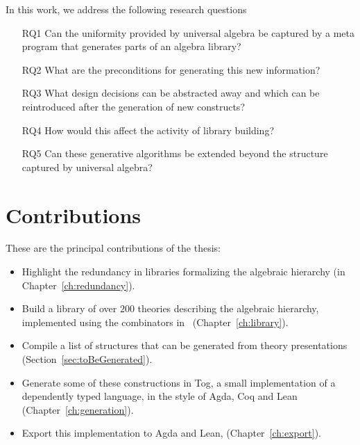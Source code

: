 In this work, we address the following research questions
\begin{enumerate}
    \item[RQ1] Can the uniformity provided by universal algebra be captured by a meta program that generates parts of an algebra library? 
    \item[RQ2] What are the preconditions for generating this new information? 
    \item[RQ3] What design decisions can be abstracted away and which can be reintroduced after the generation of new constructs?
    \item[RQ4] How would this affect the activity of library building?
    \item[RQ5] Can these generative algorithms be extended beyond the structure captured by universal algebra? 
\end{enumerate}

\section{Contributions}
These are the principal contributions of the thesis: 
\begin{itemize}
    \item Highlight the redundancy in libraries formalizing the algebraic hierarchy (in Chapter~\ref{ch:redundancy}). 
    \item Build a library of over $200$ theories describing the algebraic hierarchy, implemented using the combinators in~\cite{carette2018building} (Chapter~\ref{ch:library}). 
    \item Compile a list of structures that can be generated from theory presentations (Section~\ref{sec:toBeGenerated}). 
    \item Generate some of these constructions in Tog, a small implementation of a dependently typed language, in the style of Agda, Coq and Lean (Chapter~\ref{ch:generation}). 
    \item Export this implementation to Agda and Lean, (Chapter~\ref{ch:export}). 
\end{itemize}  

